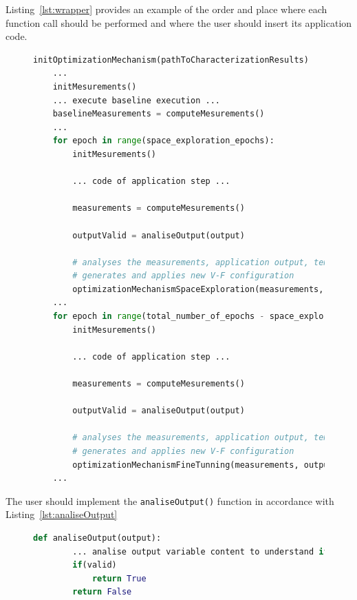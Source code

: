 Listing~\ref{lst:wrapper} provides an example of the order and place where each function call should be performed and where the user should insert its application code.


\begin{figure}[h]
    \begin{lstlisting}[language=Python, caption=Example of usage of V-F Optimization Mechanism, label=lst:wrapper, basicstyle=\footnotesize\ttfamily,abovecaptionskip=0pt, captionpos=b]
    initOptimizationMechanism(pathToCharacterizationResults)
    ...
    initMesurements()
    ... execute baseline execution ...
    baselineMeasurements = computeMesurements()
    ...
    for epoch in range(space_exploration_epochs):
        initMesurements()
        
        ... code of application step ...
        
        measurements = computeMesurements()
        
        outputValid = analiseOutput(output)
        
        # analyses the measurements, application output, temperature
        # generates and applies new V-F configuration
        optimizationMechanismSpaceExploration(measurements, outputValid)
    ...
    for epoch in range(total_number_of_epochs - space_exploration_epochs):
        initMesurements()
        
        ... code of application step ...
        
        measurements = computeMesurements()
        
        outputValid = analiseOutput(output)
        
        # analyses the measurements, application output, temperature
        # generates and applies new V-F configuration
        optimizationMechanismFineTunning(measurements, outputValid)
    ...
    \end{lstlisting}
\end{figure}


The user should implement the \texttt{analiseOutput()} function in accordance with Listing~\ref{lst:analiseOutput}

\begin{figure}[h]
    \begin{lstlisting}[language=Python, caption=analiseOutput function prototype, label=lst:analiseOutput, basicstyle=\footnotesize\ttfamily,abovecaptionskip=0pt, captionpos=b]
    def analiseOutput(output):
        ... analise output variable content to understand if output is valid ...
        if(valid)
            return True
        return False
    \end{lstlisting}
\end{figure}

